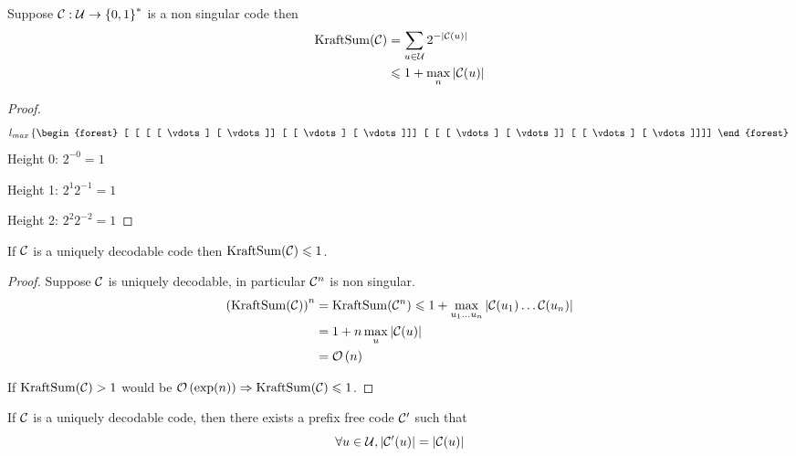 \begin{proposition}
    Suppose $\mathcal{C} : \mathcal{U} \to \left\{ 0,1 \right\}^*$ is a non singular code then
    \[
        \begin{aligned}
            \operatorname{KraftSum}(\mathcal{C}) &= \sum\limits_{u\in\mathcal{U}} 2^{-\left\lvert \mathcal{C}(u) \right\rvert}\\
            &\leqslant 1+ \max\limits_n \left\lvert \mathcal{C}(u)\right\rvert
        \end{aligned}
    \]
\end{proposition}
\begin{proof}
	\[
	    l_{max}
	    \left\lbrace
	    \begin{forest}
        	[  [  [  [ \vdots ] [ \vdots ]] [  [ \vdots ] [ \vdots ]]] [  [  [ \vdots ] [ \vdots ]] [  [ \vdots ] [ \vdots ]]]]
	    \end{forest}
	    \right.
    \]
    Height 0: $2^{-0} = 1$
    
    Height 1: $2^1 2^{-1} = 1$
    
    Height 2: $2^2 2^{-2} = 1$
\end{proof}

\begin{theorem}
    If $\mathcal{C}$ is a uniquely decodable code then $\operatorname{KraftSum}(\mathcal{C}) \leqslant 1$.
\end{theorem}
\begin{proof}
    Suppose $\mathcal{C}$ is uniquely decodable, in particular $\mathcal{C}^n$ is non singular.
    \[
        \begin{aligned}
            \left (\operatorname{KraftSum}(\mathcal{C})\right )^n &= \operatorname{KraftSum}(\mathcal{C}^n) \leqslant 1+\max\limits_{u_1\ldots u_n} \left \lvert \mathcal{C}(u_1)\ldots\mathcal{C}(u_n) \right \rvert\\
            &= 1 + n \max\limits_u \left \lvert \mathcal{C}(u) \right \rvert\\
            &= \mathcal O \left( n \right)
        \end{aligned}
    \]
    
    If $\operatorname{KraftSum}(\mathcal{C})>1$ would be $\mathcal O \left( \exp(n) \right) \Rightarrow \operatorname{KraftSum}(\mathcal{C})\leqslant 1$.
\end{proof}
\begin{corollary}
    If $\mathcal{C}$ is a uniquely decodable code, then there exists a prefix free code $\mathcal{C}'$ such that
    \[
        \forall u \in \mathcal{U}, \left\lvert \mathcal{C}'(u) \right\rvert = \left\lvert \mathcal{C}(u) \right\rvert    
    \]
\end{corollary}